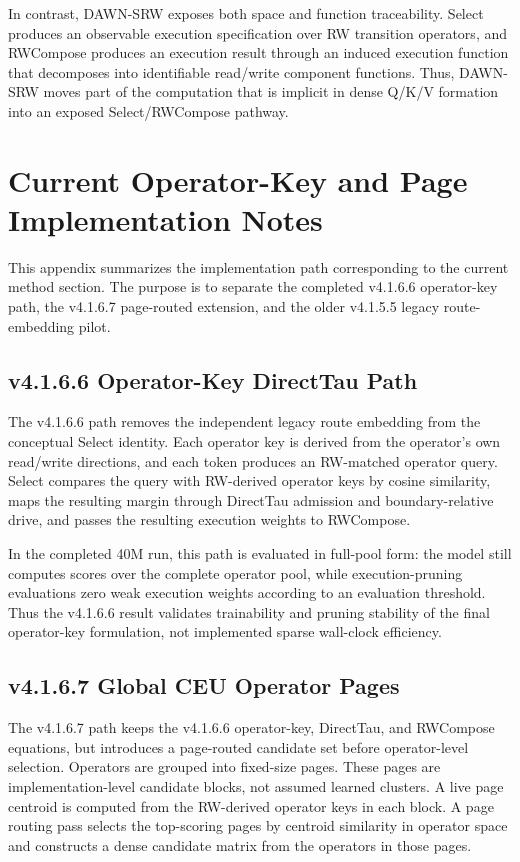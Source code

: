 \documentclass{article}
\begin{document}
In contrast, DAWN-SRW exposes both space and function traceability. Select produces an observable execution specification over RW transition operators, and RWCompose produces an execution result through an induced execution function that decomposes into identifiable read/write component functions. Thus, DAWN-SRW moves part of the computation that is implicit in dense Q/K/V formation into an exposed Select/RWCompose pathway.



\section{Current Operator-Key and Page Implementation Notes}
\label{app:operator_key_pages}

This appendix summarizes the implementation path corresponding to the current method section. The purpose is to separate the completed v4.1.6.6 operator-key path, the v4.1.6.7 page-routed extension, and the older v4.1.5.5 legacy route-embedding pilot.

\subsection{v4.1.6.6 Operator-Key DirectTau Path}

The v4.1.6.6 path removes the independent legacy route embedding from the conceptual Select identity. Each operator key is derived from the operator's own read/write directions, and each token produces an RW-matched operator query. Select compares the query with RW-derived operator keys by cosine similarity, maps the resulting margin through DirectTau admission and boundary-relative drive, and passes the resulting execution weights to RWCompose.

In the completed 40M run, this path is evaluated in full-pool form: the model still computes scores over the complete operator pool, while execution-pruning evaluations zero weak execution weights according to an evaluation threshold. Thus the v4.1.6.6 result validates trainability and pruning stability of the final operator-key formulation, not implemented sparse wall-clock efficiency.

\subsection{v4.1.6.7 Global CEU Operator Pages}

The v4.1.6.7 path keeps the v4.1.6.6 operator-key, DirectTau, and RWCompose equations, but introduces a page-routed candidate set before operator-level selection. Operators are grouped into fixed-size pages. These pages are implementation-level candidate blocks, not assumed learned clusters. A live page centroid is computed from the RW-derived operator keys in each block. A page routing pass selects the top-scoring pages by centroid similarity in operator space and constructs a dense candidate matrix from the operators in those pages.
\end{document}
